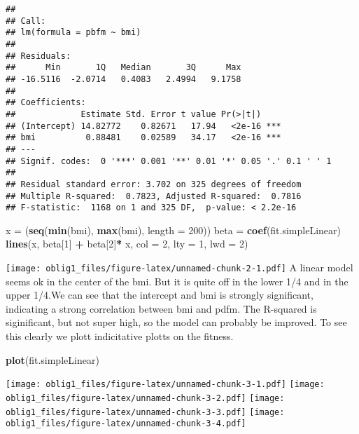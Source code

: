 \documentclass[
]{article}
\newenvironment{Shaded}{\begin{snugshade}}{\end{snugshade}}
\newcommand{\DataTypeTok}[1]{\textcolor[rgb]{0.13,0.29,0.53}{#1}}
\newcommand{\DecValTok}[1]{\textcolor[rgb]{0.00,0.00,0.81}{#1}}
\newcommand{\KeywordTok}[1]{\textcolor[rgb]{0.13,0.29,0.53}{\textbf{#1}}}
\newcommand{\NormalTok}[1]{#1}
\newcommand{\OperatorTok}[1]{\textcolor[rgb]{0.81,0.36,0.00}{\textbf{#1}}}
\newcommand{\StringTok}[1]{\textcolor[rgb]{0.31,0.60,0.02}{#1}}
\begin{document}
\begin{verbatim}
## 
## Call:
## lm(formula = pbfm ~ bmi)
## 
## Residuals:
##      Min       1Q   Median       3Q      Max 
## -16.5116  -2.0714   0.4083   2.4994   9.1758 
## 
## Coefficients:
##             Estimate Std. Error t value Pr(>|t|)    
## (Intercept) 14.82772    0.82671   17.94   <2e-16 ***
## bmi          0.88481    0.02589   34.17   <2e-16 ***
## ---
## Signif. codes:  0 '***' 0.001 '**' 0.01 '*' 0.05 '.' 0.1 ' ' 1
## 
## Residual standard error: 3.702 on 325 degrees of freedom
## Multiple R-squared:  0.7823, Adjusted R-squared:  0.7816 
## F-statistic:  1168 on 1 and 325 DF,  p-value: < 2.2e-16
\end{verbatim}

\begin{Shaded}
\begin{Highlighting}[]
\NormalTok{x =}\StringTok{ }\NormalTok{(}\KeywordTok{seq}\NormalTok{(}\KeywordTok{min}\NormalTok{(bmi), }\KeywordTok{max}\NormalTok{(bmi), }\DataTypeTok{length =} \DecValTok{200}\NormalTok{))}
\NormalTok{beta =}\StringTok{ }\KeywordTok{coef}\NormalTok{(fit.simpleLinear)}
\KeywordTok{lines}\NormalTok{(x, beta[}\DecValTok{1}\NormalTok{] }\OperatorTok{+}\StringTok{ }\NormalTok{beta[}\DecValTok{2}\NormalTok{]}\OperatorTok{*}\StringTok{ }\NormalTok{x, }\DataTypeTok{col =} \DecValTok{2}\NormalTok{, }\DataTypeTok{lty =} \DecValTok{1}\NormalTok{, }\DataTypeTok{lwd =} \DecValTok{2}\NormalTok{)}
\end{Highlighting}
\end{Shaded}

\texttt{[image: oblig1\_files/figure-latex/unnamed-chunk-2-1.pdf]} A
linear model seems ok in the center of the bmi. But it is quite off in
the lower 1/4 and in the upper 1/4.We can see that the intercept and bmi
is strongly significant, indicating a strong correlation between bmi and
pdfm. The R-squared is siginificant, but not super high, so the model
can probably be improved. To see this clearly we plott indicitative
plotts on the fitness.

\begin{Shaded}
\begin{Highlighting}[]
\KeywordTok{plot}\NormalTok{(fit.simpleLinear)}
\end{Highlighting}
\end{Shaded}

\texttt{[image: oblig1\_files/figure-latex/unnamed-chunk-3-1.pdf]}
\texttt{[image: oblig1\_files/figure-latex/unnamed-chunk-3-2.pdf]}
\texttt{[image: oblig1\_files/figure-latex/unnamed-chunk-3-3.pdf]}
\texttt{[image: oblig1\_files/figure-latex/unnamed-chunk-3-4.pdf]}
\end{document}
